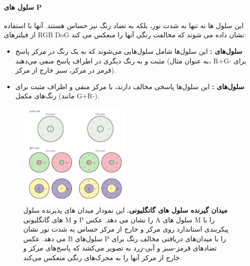                 \paragraph*{سلول های P}
                    این سلول ها نه تنها به شدت نور، بلکه به تضاد رنگ نیز حساس هستند. آنها با استفاده از فیلترهای 
                    RGB DoG 
                    نشان داده می شوند که مخالفت رنگی آنها را منعکس می کند:
                    \begin{itemize}
                        \item \textbf{سلول‌های :}  این سلول‌ها شامل سلول‌هایی می‌شوند که به یک رنگ در مرکز پاسخ مثبت و به رنگ دیگری در اطراف پاسخ منفی می‌دهند 
                        (به عنوان مثال، 
                        R+G- 
                        برای قرمز در مرکز، سبز خارج از مرکز).
                        \item \textbf{سلول‌های :} این سلول‌ها پاسخی مخالف دارند، با مرکز منفی و اطراف مثبت برای رنگ‌های مکمل 
                        (مانند G+R-).
                    \end{itemize}
                \begin{figure}[!ht]
                    \centering
                    \includegraphics[width=0.5\textwidth]{images/DoG-RGB.png} 
                    \captionsetup{width=.8\linewidth}
                    \caption{\textbf{میدان گیرنده سلول های گانگلیونی.} 
                    این نمودار میدان های پذیرنده سلول های گانگلیونی 
                    M و P 
                    را نشان می دهد. عکس 
                    A 
                    سلول های 
                    M 
                    را با پیکربندی استاندارد روی مرکز و خارج از مرکز حساس به شدت نور نشان می دهد. عکس 
                    B 
                    سلول‌های 
                    P 
                    را با میدان‌های دریافتی مخالف رنگ برای تضادهای قرمز-سبز و آبی-زرد به تصویر می‌کشد که پاسخ‌های مرکز و خارج از مرکز آنها را به محرک‌های رنگی منعکس می‌کند.
                    }
                    \label{fig:part1-DoG-RGB}
                \end{figure}
